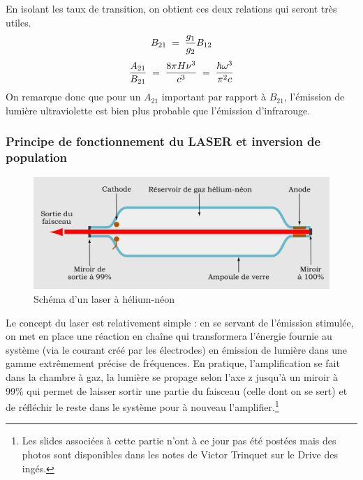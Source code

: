 En isolant les taux de transition, on obtient ces deux relations qui seront très utiles.
\begin{equation}
    B_{21} \; = \; \dfrac{g_1}{g_2}B_{12}
    \label{eq:equilire1}
\end{equation}
\begin{equation}
    \dfrac{A_{21}}{B_{21}} 
    \; = \; \dfrac{8\pi H \nu^3}{c^3}
    \; = \; \dfrac{\hbar \omega^3}{\pi^2c}
    \label{eq:equilire2}
\end{equation}
On remarque donc que pour un $A_{21}$ important par rapport à $B_{21}$, l'émission de lumière ultraviolette est bien plus probable que l'émission d'infrarouge.


\subsubsection{Principe de fonctionnement du LASER et inversion de population}



\begin{figure}[tph]
    \centering
    \includegraphics[scale=0.7]{Images2/Laser.png}
    \caption{Schéma d'un laser à hélium-néon}
    \label{fig:Laser}
\end{figure}
Le concept du laser est relativement simple : en se servant de l'émission stimulée, on met en place une réaction en chaîne qui transformera l'énergie fournie au système (via le courant créé par les électrodes) en émission de lumière dans une gamme extrêmement précise de fréquences. En pratique, l'amplification se fait dans la chambre à gaz, la lumière se propage selon l'axe z jusqu'à un miroir à 99\% qui permet de laisser sortir une partie du faisceau (celle dont on se sert) et de réfléchir le reste dans le système pour à nouveau l'amplifier.\footnote{Les slides associées à cette partie n'ont à ce jour pas été postées mais des photos sont disponibles dans les notes de Victor Trinquet sur le Drive des ingés.}\\

